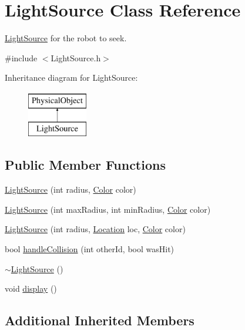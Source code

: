 \hypertarget{classLightSource}{\section{Light\-Source Class Reference}
\label{classLightSource}
}


\hyperlink{classLightSource}{Light\-Source} for the robot to seek.  




{\ttfamily \#include $<$Light\-Source.\-h$>$}

Inheritance diagram for Light\-Source\-:\begin{figure}[H]
\begin{center}
\leavevmode
\includegraphics[height=2.000000cm]{classLightSource}
\end{center}
\end{figure}
\subsection*{Public Member Functions}
\begin{DoxyCompactItemize}
\item 
\hyperlink{classLightSource_a11168d72f5e489b8d4b5c6056682e5fa}{Light\-Source} (int radius, \hyperlink{structColor}{Color} color)
\item 
\hyperlink{classLightSource_aa13ee0c57818324958659a5a88bf4b1d}{Light\-Source} (int max\-Radius, int min\-Radius, \hyperlink{structColor}{Color} color)
\item 
\hyperlink{classLightSource_a953998d4d97c0efda733c208258e4a8b}{Light\-Source} (int radius, \hyperlink{structLocation}{Location} loc, \hyperlink{structColor}{Color} color)
\item 
bool \hyperlink{classLightSource_a6c0da63e11edd3f108c9fe8c2a9dfd52}{handle\-Collision} (int other\-Id, bool was\-Hit)
\item 
\hyperlink{classLightSource_a55e5876407fd4af9e9b4ede7ff46cc85}{$\sim$\-Light\-Source} ()
\item 
void \hyperlink{classLightSource_a2148117298a6bb0d60dcfb3bd99700db}{display} ()
\end{DoxyCompactItemize}
\subsection*{Additional Inherited Members}


